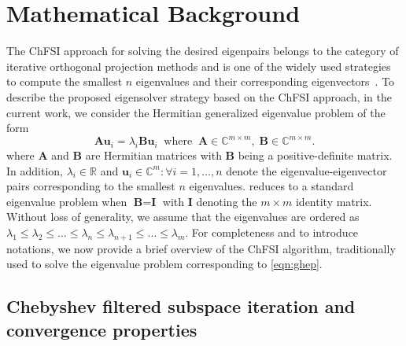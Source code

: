 \documentclass[preprint,3p,number,sort&compress]{elsarticle}
\newcommand{\bu}{\textbf{u}}
\newcommand{\bA}{\textbf{A}}
\newcommand{\bB}{\textbf{B}}
\newcommand{\bI}{\textbf{I}}
\begin{document}
\section{Mathematical Background}
\label{sec:background}
The ChFSI \cite{saadChebyshevAccelerationTechniques1984,saadNumericalMethodsLarge2011,zhouParallelSelfconsistentfieldCalculations2006,zhouSelfconsistentfieldCalculationsUsing2006,motamarriHigherorderAdaptiveFiniteelement2013,zhouChebyshevfilteredSubspaceIteration2014} approach for solving the desired eigenpairs belongs to the category of iterative orthogonal projection methods and is one of the widely used strategies to compute the smallest $n$ eigenvalues and their corresponding eigenvectors~\cite{dektorInexactSubspaceProjection2025,dasDFTFE10Massively2022,motamarriDFTFEMassivelyParallel2020,zhangSPARCV200Spinorbit2024,ghoshSPARCAccurateEfficient2017a,xuSPARCSimulationPackage2021,kronikPARSECPseudopotentialAlgorithm2006,liouScalableImplementationPolynomial2020,winkelmannChASE2019,michaud-riouxRESCURealSpace2016,doganSolvingElectronicStructure2023,levittParallelEigensolversPlanewave2015}. To describe the proposed eigensolver strategy based on the ChFSI approach, in the current work, we consider the Hermitian generalized eigenvalue problem of the form 
\begin{equation}
\bA\bu_i=\lambda_i\bB\bu_i \;\; \text{where} \;\; \bA\in \mathbb{C}^{m\times m},\; \bB\in \mathbb{C}^{m\times m}.\label{eqn:ghep}
\end{equation}
where $\bA$ and $\bB$ are Hermitian matrices with $\bB$ being a positive-definite matrix. In addition, $\lambda_i\in \mathbb{R}$ and $\bu_i\in\mathbb{C}^{m}:\forall i=1,\dots,n$ denote the eigenvalue-eigenvector pairs corresponding to the smallest $n$ eigenvalues.  reduces to a standard eigenvalue problem when $\bB=\bI$ with $\bI$ denoting the $m\times m$ identity matrix. Without loss of generality, we assume that the eigenvalues are ordered as $\lambda_1\leq\lambda_2\leq\dots\leq\lambda_n\leq\lambda_{n+1}\leq\dots\leq\lambda_m$. For completeness and to introduce notations, we now provide a brief overview of the ChFSI algorithm, traditionally used to solve the eigenvalue problem corresponding to \cref{eqn:ghep}.

\subsection{Chebyshev filtered subspace iteration and convergence properties}
\end{document}
